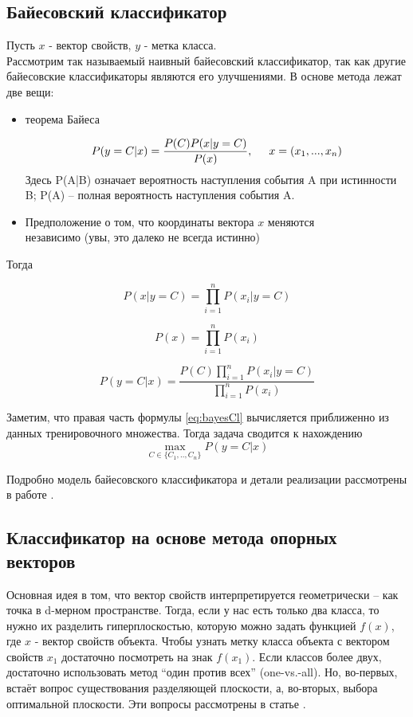 \documentclass{article}
\begin{document}
\subsection{Байесовский классификатор}
Пусть $x$ - вектор свойств, $y$ - метка класса. \\
Рассмотрим так называемый наивный байесовский классификатор, так как другие байесовские классификаторы являются его улучшениями. В основе метода лежат две вещи:
\begin{itemize}
\item{теорема Байеса}

\begin{equation}
P(y=C|x)=\frac{P(C) P(x|y=C)}{P(x)}
,\hspace{5mm} x = (x_1, ..., x_n)
\end{equation}
Здесь P(A|B) означает вероятность наступления события A при истинности B; P(A) -- полная вероятность наступления события A.
\item{Предположение о том, что координаты вектора $x$ меняются \\независимо  (увы, это далеко не всегда истинно)}
\end{itemize}
Тогда

\begin{equation}
P(x|y=C) = \prod_{i=1}^n{P(x_i|y=C)}
\end{equation}

\begin{equation}
P(x) = \prod_{i=1}^n{P(x_i)}
\end{equation}

\begin{equation}
\label{eq:bayesCl}
P(y=C|x)=\frac{P(C) \prod_{i=1}^n{P(x_i|y=C)}}{\prod_{i=1}^n{P(x_i)}}
\end{equation}

Заметим, что правая часть формулы \eqref{eq:bayesCl} вычисляется приближенно из данных тренировочного множества.
Тогда задача сводится к нахождению
\begin{equation}
\max_{C \in \{C_1,..,C_n\}}P(y=C|x)
\end{equation}

Подробно модель байесовского классификатора и детали реализации рассмотрены в работе
\cite{murphy2006naive}.

\subsection{Классификатор на основе метода опорных\\ векторов}
Основная идея в том, что вектор свойств интерпретируется геометрически --  как точка в d-мерном пространстве. Тогда, если у нас есть только два класса, то нужно их разделить гиперплоскостью, которую можно задать функцией $f(x)$, где $x$ - вектор свойств объекта. Чтобы узнать метку класса объекта с вектором свойств $x_1$ достаточно посмотреть на знак $f(x_1)$. Если классов более двух, достаточно использовать метод ``один против всех'' (one-vs.-all). Но, во-первых, встаёт вопрос существования разделяющей плоскости, а, во-вторых, выбора оптимальной плоскости. Эти вопросы рассмотрены в статье \cite{svm}.
\end{document}
